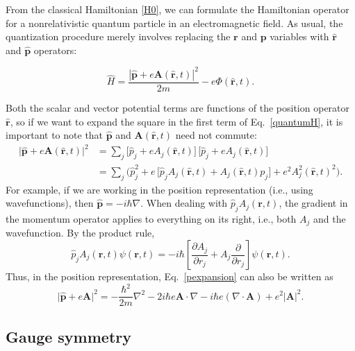 \documentclass[prx,12pt]{revtex4-2}
\begin{document}
From the classical Hamiltonian \eqref{H0}, we can formulate the
Hamiltonian operator for a nonrelativistic quantum particle in an
electromagnetic field.  As usual, the quantization procedure merely
involves replacing the $\mathbf{r}$ and $\mathbf{p}$ variables with
$\hat{\mathbf{r}}$ and $\hat{\mathbf{p}}$ operators:
\begin{framed}
  \begin{equation}
    \hat{H} = \frac{|\hat{\mathbf{p}}+e\mathbf{A}(\hat{\mathbf{r}},t)|^2}{2m}
    - e\Phi(\hat{\mathbf{r}},t).
    \label{quantumH}
  \end{equation}
\end{framed}
\noindent
Both the scalar and vector potential terms are functions of the
position operator $\hat{\mathbf{r}}$, so if we want to expand the
square in the first term of Eq.~\eqref{quantumH}, it is important to
note that $\hat{\mathbf{p}}$ and $\mathbf{A}(\hat{\mathbf{r}},t)$ need
not commute:
\begin{align}
  \big|\hat{\mathbf{p}}+e\mathbf{A}(\hat{\mathbf{r}},t)\big|^2
  &= \sum_j \Big[\hat{p}_j + e A_j(\hat{\mathbf{r}},t)\Big] \,
  \Big[\hat{p}_j + e A_j(\hat{\mathbf{r}},t)\Big]\\
  &= \sum_j \Big( \hat{p}_j^2
  + e\, \big[\hat{p}_j A_j(\hat{\mathbf{r}},t) + A_j(\hat{\mathbf{r}},t) p_j\big]
  + e^2A_j^2(\hat{\mathbf{r}},t)^2 \Big).
  \label{pexpansion}
\end{align}
For example, if we are working in the position representation (i.e.,
using wavefunctions), then $\hat{\mathbf{p}} = -i\hbar\nabla$.  When
dealing with $\hat{p}_j A_j(\mathbf{r},t)$, the gradient in the
momentum operator applies to everything on its right, i.e., both $A_j$
and the wavefunction.  By the product rule,
\begin{equation}
  \hat{p}_j A_j(\mathbf{r},t) \psi(\mathbf{r},t)
  = -i\hbar \left[\frac{\partial A_j}{\partial r_j} + A_j \frac{\partial}{\partial r_j}\right] \psi(\mathbf{r},t).
\end{equation}
Thus, in the position representation, Eq.~\eqref{pexpansion} can also
be written as
\begin{equation}
  \big|\hat{\mathbf{p}}+e\mathbf{A}\big|^2
  = - \frac{\hbar^2}{2m} \nabla^2
  - 2 i \hbar e \mathbf{A} \cdot \nabla
  - i \hbar e \left(\nabla\cdot \mathbf{A}\right)
  + e^2|\mathbf{A}|^2.
\end{equation}

\subsection{Gauge symmetry}
\label{sec:gauge}
\end{document}

